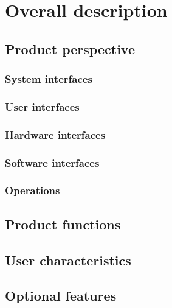 \chapter{Overall description}
	\section{Product perspective}
		\subsection{System interfaces}
		\subsection{User interfaces}
		\subsection{Hardware interfaces}
		\subsection{Software interfaces}
		\subsection{Operations}
	\section{Product functions}
	\section{User characteristics}
	\section{Optional features}